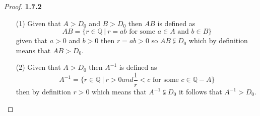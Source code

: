 \documentclass[11pt]{article}
\newcommand{\Q}{\mathbb{Q}}
\theoremstyle{definition}
\begin{document}
    \begin{proof}{\textbf{1.7.2}}
        \begin{itemize}
            \item [(1)] Given that $A > D_0$ and $B > D_0$ then $AB$ is defined as
            $$AB = \{r \in \Q ~|~ r=ab \text{ for some }a\in A \text{ and }b \in B\}$$
            given that $a>0$ and $b>0$ then $r=ab>0$ so $AB \subsetneqq D_0$ which by
            definition means that $AB > D_0$.
            \item [(2)] Given that $A > D_0$ then $A^{-1}$ is defined as
            $$A^{-1} = \{r \in \Q ~|~ r>0 and \frac{1}{r}<c \text{ for some }c \in \Q-A\}$$ 
            then by definition $r>0$ which means that $A^{-1} \subsetneqq D_0$ it follows
            that $A^{-1} > D_0$.
        \end{itemize}
    \end{proof}
\end{document}
